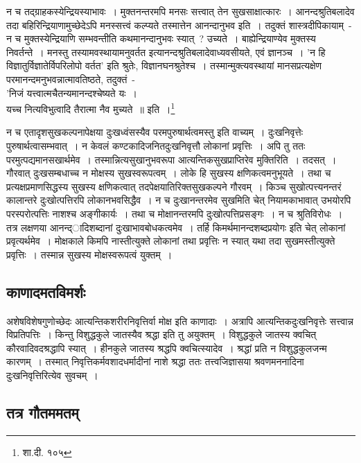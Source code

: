 		न च तद्ग्राहकस्येन्द्रियस्याभावः~। मुक्तनन्तरमपि मनसः सत्त्वात् तेन सुखसाक्षात्कारः~। आनन्दश्रुतिबलादेव तदा बहिरिन्द्रियाणामुच्छेदेऽपि मनस्सत्त्वं कल्प्यते तस्मात्तेन आनन्दानुभव इति~। तदुक्तं शास्त्रदीपिकायाम्~- {\fontsize{11.7}{0}\selectfont\s  न च मुक्तस्येन्द्रियाणि सम्भवन्तीति कथमानन्दानुभवः स्यात्~? उच्यते~। बाह्येन्द्रियाण्येव मुक्तस्य निवर्तन्ते~। मनस्तु तस्यामवस्थायामनुवर्तत इत्यानन्दश्रुतिबलादेवाध्यवसीयते, एवं ज्ञानञ्च~। 'न हि विज्ञातुर्विज्ञातेर्विपरिलोपो वर्तत' इति श्रुतेः, विज्ञानघनश्रुतेश्च~। तस्मान्मुक्त्यवस्थायां मानसप्रत्यक्षेण परमानन्दमनुभवन्नात्मावतिष्ठते, तदुक्तं~-\\ 'निजं यत्त्वात्मचैतन्यमानन्दश्चेष्यते यः~।\\ यच्च नित्यविभुत्वादि तैरात्मा नैव मुच्यते~॥ इति~।\footnote{शा.दी. १०५}}

		 न च एतादृशसुखकल्पनापेक्षया दुःखध्वंसस्यैव परमपुरुषार्थत्वमस्तु इति वाच्यम्~। दुःखनिवृत्तेः पुरुषार्थत्वासम्भवात्~। न केवलं कण्टकादिजनितदुःखनिवृत्तौ लोकानां प्रवृत्तिः~। अपि तु ततः परमुत्पद्यमानसखार्थमेव~। तस्मान्नित्यसुखानुभवरूपा आत्यन्तिकसुखप्राप्तिरेव मुक्तिरिति~। तदसत्~। गौरवात् दुःखसम्बधाच्च न मोक्षस्य सुखस्वरूपत्वम्~। लोके हि सुखस्य क्षणिकत्वमनुभूयते~। तथा च प्रत्यक्षप्रमाणसिद्धस्य सुखस्य क्षणिकत्वात् तदपेक्षयातिरिक्तसुखकल्पने गौरवम्~। किञ्च सुखोत्पत्त्यनन्तरं कालान्तरे दुःखोत्पत्तिरपि लोकानभवसिद्धैव~। न च दुःखानन्तरमेव सुखमिति चेत् नियामकाभावात् उभयोरपि परस्परोत्पत्तिः नाशश्च अङ्गीकार्यः~। तथा च मोक्षानन्तरमपि दुःखोत्पत्तिप्रसङ्गः~। न च श्रुतिविरोधः~। तत्र लक्षणया आनन्द्ादिशब्दानां दुःखाभावबोधकत्वमेव~। तर्हि किमर्थमानन्दशब्दप्रयोगः इति चेत् लोकानां प्रवृत्यर्थमेव~। मोक्षकाले किमपि नास्तीत्युक्ते लोकानां तथा प्रवृत्तिः न स्यात् यथा तदा सुखमस्तीत्युक्ते प्रवृत्तिः~। तस्मान्न सुखस्य मोक्षस्वरूपत्वं युक्तम्~।

		\subsection{काणादमतविमर्शः}

		अशेषविशेषगुणोच्छेदः आत्यन्तिकशरीरनिवृत्तिर्वा मोक्ष इति काणादाः~। अत्रापि आत्यन्तिकदुःखनिवृत्तेः सत्त्वान्न विप्रतिपत्तिः~। किन्तु विशुद्धकुले जातस्यैव श्रद्धा इति तु अयुक्तम्~। विशुद्धकुले जातस्य क्वचित् कौरवादिवदश्रद्धापि स्यात्~। हीनकुले जातस्य श्रद्धपि क्वचित्स्यादेव~। श्रद्धां प्रति न विशुद्धकुलजन्म कारणम्~। तस्मात् निवृत्तिकर्मवशादधर्मादीनां नाशे श्रद्धा ततः तत्त्वजिज्ञासया श्रवणमननादिना दुःखनिवृत्तिरित्येव सुवचम्~।

		\subsection{तत्र गौतममतम्}

